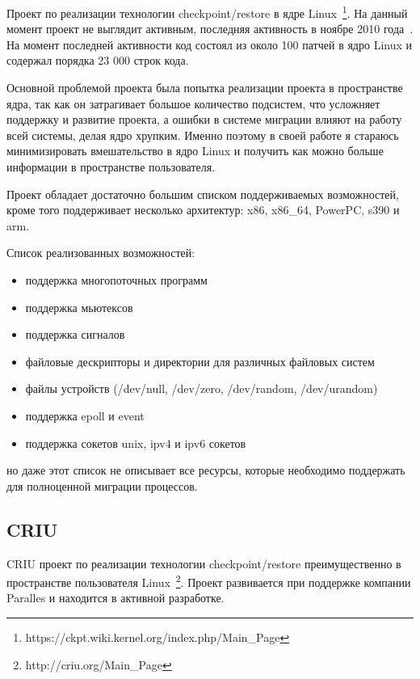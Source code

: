Проект по реализации технологии checkpoint/restore в ядре Linux~\footnote{https://ckpt.wiki.kernel.org/index.php/Main\_Page}. На данный момент проект не выглядит активным, последняя активность в ноябре 2010 года~\cite{linux_cr_lwn_report}. На момент последней активности код состоял из около 100 патчей в ядро Linux и содержал порядка 23 000 строк кода.

Основной проблемой проекта была попытка реализации проекта в пространстве ядра, так как он затрагивает большое количество подсистем, что усложняет поддержку и развитие проекта, а ошибки в системе миграции влияют на работу всей системы, делая ядро хрупким. Именно поэтому в своей работе я стараюсь минимизировать вмешательство в ядро Linux и получить как можно больше информации в пространстве пользователя.

Проект обладает достаточно большим списком поддерживаемых возможностей, кроме того поддерживает несколько архитектур: x86, x86\_64, PowerPC, s390 и arm.

Список реализованных возможностей:

\begin{itemize}

    \item поддержка многопоточных программ
    \item поддержка мьютексов
    \item поддержка сигналов
    \item файловые дескрипторы и директории для различных файловых систем
    \item файлы устройств (/dev/null, /dev/zero, /dev/random, /dev/urandom)
    \item поддержка epoll и event
    \item поддержка сокетов unix, ipv4 и ipv6 сокетов

\end{itemize}

но даже этот список не описывает все ресурсы, которые необходимо поддержать для полноценной миграции процессов.

\subsection{CRIU}

CRIU проект по реализации технологии checkpoint/restore преимущественно в пространстве пользователя Linux~\footnote{http://criu.org/Main\_Page}. Проект развивается при поддержке компании Paralles и находится в активной разработке.

